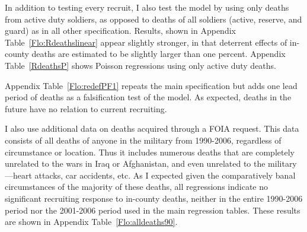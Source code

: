 \documentclass[12pt] {article}
\begin{document}
In addition to testing every recruit, I also test the model by using only deaths from active duty soldiers, as opposed to deaths of all soldiers (active, reserve, and guard) as in all other specification. Results, shown in Appendix Table~\ref{Flo:Rdeathslinear} appear slightly stronger, in that deterrent effects of in-county deaths are estimated to be slightly larger than one percent. Appendix Table~\ref{RdeathsP} shows Poisson regressions using only active duty deaths.

Appendix Table~\ref{Flo:redefPF1} repeats the main specification but adds one lead period of deaths as a falsification test of the model. As expected, deaths in the future have no relation to current recruiting.

I also use additional data on deaths acquired through a FOIA request. This data consists of all deaths of anyone in the military from 1990-2006, regardless of circumstance or location. Thus it includes numerous deaths that are completely unrelated to the wars in Iraq or Afghanistan, and even unrelated to the military---heart attacks, car accidents, etc. As I expected given the comparatively banal circumstances of the majority of these deaths, all regressions indicate no significant recruiting response to in-county deaths, neither in the entire 1990-2006 period nor the 2001-2006 period used in the main regression tables. These results are shown in Appendix Table~\ref{Flo:alldeaths90}.
\end{document}
